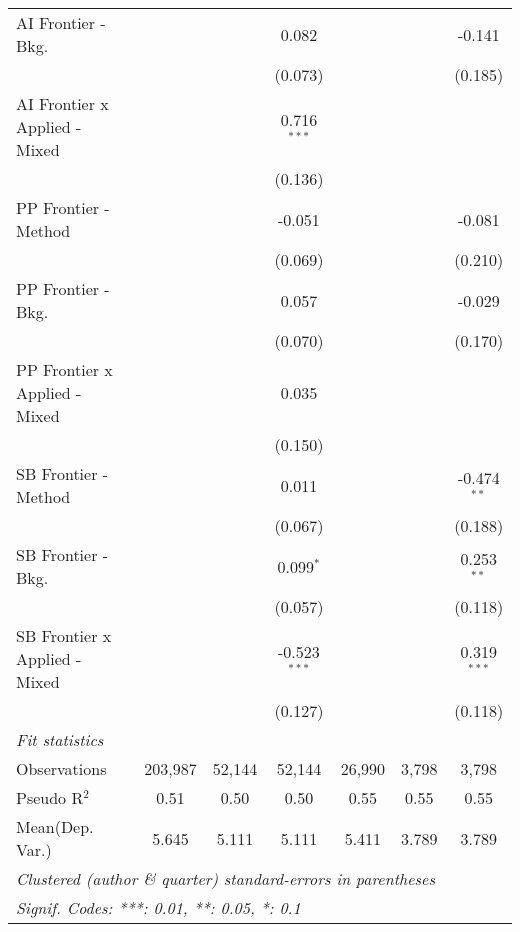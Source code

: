 \begin{tabular}{lcccccc}
   AI Frontier - Bkg.            &               &         & 0.082          &              &         & -0.141\\   
                                 &               &         & (0.073)        &              &         & (0.185)\\   
   AI Frontier x Applied - Mixed &               &         & 0.716$^{***}$  &              &         &   \\   
                                 &               &         & (0.136)        &              &         &   \\   
   PP Frontier - Method          &               &         & -0.051         &              &         & -0.081\\   
                                 &               &         & (0.069)        &              &         & (0.210)\\   
   PP Frontier - Bkg.            &               &         & 0.057          &              &         & -0.029\\   
                                 &               &         & (0.070)        &              &         & (0.170)\\   
   PP Frontier x Applied - Mixed &               &         & 0.035          &              &         &   \\   
                                 &               &         & (0.150)        &              &         &   \\   
   SB Frontier - Method          &               &         & 0.011          &              &         & -0.474$^{**}$\\   
                                 &               &         & (0.067)        &              &         & (0.188)\\   
   SB Frontier - Bkg.            &               &         & 0.099$^{*}$    &              &         & 0.253$^{**}$\\   
                                 &               &         & (0.057)        &              &         & (0.118)\\   
   SB Frontier x Applied - Mixed &               &         & -0.523$^{***}$ &              &         & 0.319$^{***}$\\   
                                 &               &         & (0.127)        &              &         & (0.118)\\   
   \midrule
   \emph{Fit statistics}\\
   Observations                  & 203,987       & 52,144  & 52,144         & 26,990       & 3,798   & 3,798\\  
   Pseudo R$^2$                  & 0.51          & 0.50    & 0.50           & 0.55         & 0.55    & 0.55\\  
Mean(Dep. Var.) & 5.645 & 5.111 & 5.111 & 5.411 & 3.789 & 3.789 \\
   \midrule \midrule
   \multicolumn{7}{l}{\emph{Clustered (author \& quarter) standard-errors in parentheses}}\\
   \multicolumn{7}{l}{\emph{Signif. Codes: ***: 0.01, **: 0.05, *: 0.1}}\\
\end{tabular}
\par\endgroup
